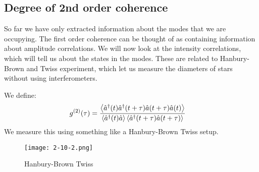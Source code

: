 \subsection{Degree of 2nd order coherence}
So far we have only extracted information about the modes that we are occupying. The first order coherence can be thought of as containing information about amplitude correlations.
We will now look at the intensity correlations, which will tell us about the states in the modes.
These are related to Hanbury-Brown and Twiss experiment, which let us measure the diameters of stars without using interferometers.

We define:
\begin{align*}
	g^{(2)}(\tau) &= \frac{\expval{\hat{a}^\dagger(t)\hat{a}^\dagger(t+\tau)\hat{a}(t+\tau)\hat{a}(t)}}{\expval{\hat{a}^\dagger(t)\hat{a}}\expval{\hat{a}^\dagger(t+\tau)\hat{a}(t+\tau)}}
\end{align*}
We measure this using something like a Hanbury-Brown Twiss setup.
\begin{figure*}[h]
	\centering
	\texttt{[image: 2-10-2.png]}
	\caption*{Hanbury-Brown Twiss}
\end{figure*}

